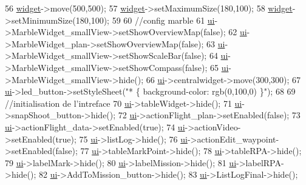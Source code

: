 \begin{DoxyCode}
56     \hyperlink{a00008_a549c5bee62879e34e9d21701730a2907}{widget}->move(500,500);
57     \hyperlink{a00008_a549c5bee62879e34e9d21701730a2907}{widget}->setMaximumSize(180,100);
58     \hyperlink{a00008_a549c5bee62879e34e9d21701730a2907}{widget}->setMinimumSize(180,100);
59 
60     \textcolor{comment}{//config marble}
61     \hyperlink{a00008_a6dc041ef6a2ffb329928d2913e8344e6}{ui}->MarbleWidget\_smallView->setShowOverviewMap(\textcolor{keyword}{false});
62     \hyperlink{a00008_a6dc041ef6a2ffb329928d2913e8344e6}{ui}->MarbleWidget\_plan->setShowOverviewMap(\textcolor{keyword}{false});
63     \hyperlink{a00008_a6dc041ef6a2ffb329928d2913e8344e6}{ui}->MarbleWidget\_smallView->setShowScaleBar(\textcolor{keyword}{false});
64     \hyperlink{a00008_a6dc041ef6a2ffb329928d2913e8344e6}{ui}->MarbleWidget\_smallView->setShowCompass(\textcolor{keyword}{false});
65     \hyperlink{a00008_a6dc041ef6a2ffb329928d2913e8344e6}{ui}->MarbleWidget\_smallView->hide();
66     \hyperlink{a00008_a6dc041ef6a2ffb329928d2913e8344e6}{ui}->centralwidget->move(300,300);
67     \hyperlink{a00008_a6dc041ef6a2ffb329928d2913e8344e6}{ui}->led\_button->setStyleSheet(\textcolor{stringliteral}{"* \{ background-color: rgb(0,100,0) \}"});
68 
69     \textcolor{comment}{//initialisation de l'intreface}
70     \hyperlink{a00008_a6dc041ef6a2ffb329928d2913e8344e6}{ui}->tableWidget->hide();
71     \hyperlink{a00008_a6dc041ef6a2ffb329928d2913e8344e6}{ui}->snapShoot\_button->hide();
72     \hyperlink{a00008_a6dc041ef6a2ffb329928d2913e8344e6}{ui}->actionFlight\_plan->setEnabled(\textcolor{keyword}{false});
73     \hyperlink{a00008_a6dc041ef6a2ffb329928d2913e8344e6}{ui}->actionFlight\_data->setEnabled(\textcolor{keyword}{true});
74     \hyperlink{a00008_a6dc041ef6a2ffb329928d2913e8344e6}{ui}->actionVideo->setEnabled(\textcolor{keyword}{true});
75     \hyperlink{a00008_a6dc041ef6a2ffb329928d2913e8344e6}{ui}->listLog->hide();
76     \hyperlink{a00008_a6dc041ef6a2ffb329928d2913e8344e6}{ui}->actionEdit\_waypoint->setEnabled(\textcolor{keyword}{false});
77     \hyperlink{a00008_a6dc041ef6a2ffb329928d2913e8344e6}{ui}->tableMarkPoint->hide();
78     \hyperlink{a00008_a6dc041ef6a2ffb329928d2913e8344e6}{ui}->tableRPA->hide();
79     \hyperlink{a00008_a6dc041ef6a2ffb329928d2913e8344e6}{ui}->labelMark->hide();
80     \hyperlink{a00008_a6dc041ef6a2ffb329928d2913e8344e6}{ui}->labelMission->hide();
81     \hyperlink{a00008_a6dc041ef6a2ffb329928d2913e8344e6}{ui}->labelRPA->hide();
82     \hyperlink{a00008_a6dc041ef6a2ffb329928d2913e8344e6}{ui}->AddToMission\_button->hide();
83     \hyperlink{a00008_a6dc041ef6a2ffb329928d2913e8344e6}{ui}->ListLogFinal->hide();

\end{DoxyCode}
